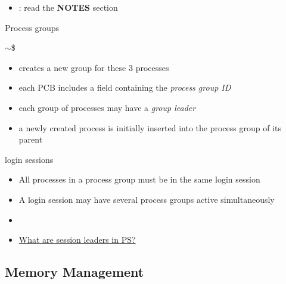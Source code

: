 \begin{itemize}
\item[] : read the \textbf{NOTES} section  
\end{itemize}

\begin{frame}%
  \begin{exampleblock}{Process groups}
    \begin{center}
      $\sim$\$ 
    \end{center}
    \begin{itemize}
    \item {} creates a new group for these 3 processes
    \item each PCB includes a field containing the \emph{process group ID}
    \item each group of processes may have a \emph{group leader}
    \item a newly created process is initially inserted into the process group of its
      parent
    \end{itemize}
  \end{exampleblock}
  \begin{exampleblock}{login sessions}
    \begin{itemize}
    \item All processes in a process group must be in the same login session
    \item A login session may have several process groups active simultaneously
    \end{itemize}
  \end{exampleblock}
\end{frame}

\begin{itemize}
\item {}
\item
  \href{http://unix.stackexchange.com/questions/18166/what-are-session-leaders-in-ps}{What
  are session leaders in PS?}
\end{itemize}

\subsection{Memory Management}
\label{sec:memory-management}

